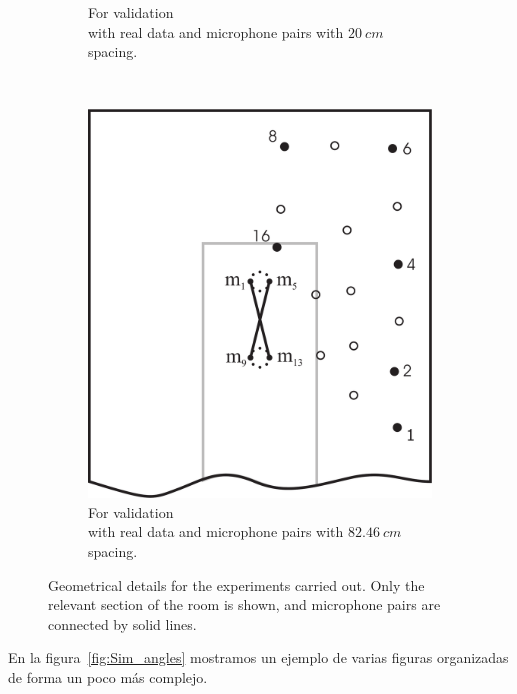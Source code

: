 \documentclass[spanish,openright]{book}
\begin{document}
\begin{figure}
\begin{subfigure}[t]{0.3\textwidth}
\caption{For validation\\with real data and microphone pairs with $20~cm$ spacing.}
\label{fig:real_positions_short}
\end{subfigure}
~
\begin{subfigure}[t]{0.3\textwidth}
\includegraphics[width=\textwidth]{positions2-short-improved}
\caption{For validation\\with real data and microphone pairs with
$82.46~cm$ spacing.}
\label{fig:real_positions_long}
\end{subfigure}
\caption{Geometrical details for the experiments carried out. Only the
relevant section of the room is shown, and microphone pairs are
connected by solid lines.}
\label{fig:simureal_positions}
\end{figure}

En la figura~\ref{fig:Sim_angles} mostramos un ejemplo de varias
figuras organizadas de forma un poco más complejo.
\end{document}

